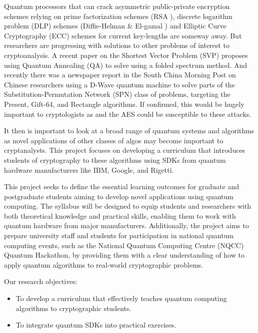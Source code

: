 \documentclass[11pt,a4paper]{article}
\begin{document}
Quantum processors that can crack asymmetric public-private encryption schemes relying on prime factorization schemes
(RSA \cite{Rivest:1978}), discrete logarithm problem (DLP) schemes (Diffie-Helman \cite{Diffie:1976} \& El-gamal \cite{ElGamal:1985}) and
Elliptic Curve Cryptography (ECC) \cite{Koblitz:1987} schemes for current key-lengths are someway away.
But researchers are progressing with solutions to other problems of interest to cryptoanalysis. A recent paper on the 
Shortest Vector Problem (SVP) \cite{Mizuno:2024} proposes using Quantum 
Annealing (QA) to solve using a folded spectrum method.  
And recently there was a newspaper report in the South China Morning Post on Chinese researchers using a D-Wave quantum
machine to solve parts of the Substitution-Permutation Network (SPN) class of problems, targeting the Present, Gift-64, and Rectangle 
algorithms.  If confirmed, this would be hugely important to cryptologists as and the AES \cite{Wiki:AES:2024} could
be susceptible to these attacks.

It then is important to look at a broad range of quantum systems and algorithms as novel applications of other classes
of algos may become important to cryptanalysts.  This project focuses on developing a curriculum that introduces 
students of cryptography to these algorithms using SDKs from quantum hardware manufacturers like IBM, Google, and Rigetti.

This project seeks to define the essential learning outcomes for graduate and postgraduate students aiming to develop novel
applications using quantum computing.
The syllabus will be designed to equip students and researchers with both theoretical knowledge and practical skills,
enabling them to work with quantum hardware from major manufacturers.
Additionally, the project aims to prepare university staff and students for participation in national quantum
computing events, such as the National Quantum Computing Centre (NQCC) Quantum Hackathon, by providing them with a
clear understanding of how to apply quantum algorithms to real-world cryptographic problems.

Our research objectives:
\begin{itemize}
\item To develop a curriculum that effectively teaches quantum computing algorithms to cryptographic students.
\item To integrate quantum SDKs into practical exercises.
\end{itemize}
\end{document}
